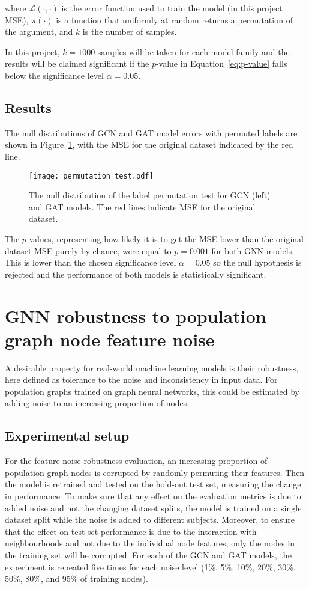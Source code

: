where $\mathcal{L}(\cdot, \cdot)$ is the error function used to train the model (in this project MSE), $\pi(\cdot)$ is a function that uniformly at random returns a permutation of the argument, and $k$ is the number of samples.

In this project, $k=1000$ samples will be taken for each model family and the results will be claimed significant if the $p$-value in Equation~\eqref{eq:p-value} falls below the significance level $\alpha=0.05$. 

\subsection{Results}
The null distributions of GCN and GAT model errors with permuted labels are shown in Figure~\ref{figure:permutation-test}, with the MSE for the original dataset indicated by the red line.

\begin{figure}[h]
    \centering
    \texttt{[image: permutation\_test.pdf]}
    \caption{The null distribution of the label permutation test for GCN (left) and GAT models. The red lines indicate MSE for the original dataset.}\label{figure:permutation-test}
\end{figure}

The $p$-values, representing how likely it is to get the MSE lower than the original dataset MSE purely by chance, were equal to $p=0.001$ for both GNN models. This is lower than the chosen significance level $\alpha=0.05$ so the null hypothesis is rejected and the performance of both models is statistically significant.


\section{GNN robustness to population graph node feature noise}
\label{section:node-noise}
A desirable property for real-world machine learning models is their robustness, here defined as tolerance to the noise and inconsistency in input data.
For population graphs trained on graph neural networks, this could be estimated by adding noise to an increasing proportion of nodes. 

\subsection{Experimental setup}
For the feature noise robustness evaluation, an increasing proportion of population graph nodes is corrupted by randomly permuting their features. Then the model is retrained and tested on the hold-out test set, measuring the change in performance. To make sure that any effect on the evaluation metrics is due to added noise and not the changing dataset splits, the model is trained on a single dataset split while the noise is added to different subjects. Moreover, to ensure that the effect on test set performance is due to the interaction with neighbourhoods and not due to the individual node features, only the nodes in the training set will be corrupted. For each of the GCN and GAT models, the experiment is repeated five times for each noise level (1\%, 5\%, 10\%, 20\%, 30\%, 50\%, 80\%, and 95\% of training nodes).

